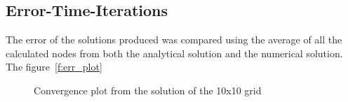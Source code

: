 \documentclass[]{aiaa-tc}%
\begin{document}
\FloatBarrier\subsection{Error-Time-Iterations}
The error of the solutions produced was compared using the average of all the calculated nodes from both the analytical solution and the numerical solution. The figure~\ref{f:err_plot}

\begin{figure}[htb]%
  \caption{Convergence plot from the solution of the 10x10 grid}
  \begin{subfigmatrix}{2}

\end{subfigmatrix}
\end{figure}
\end{document}
